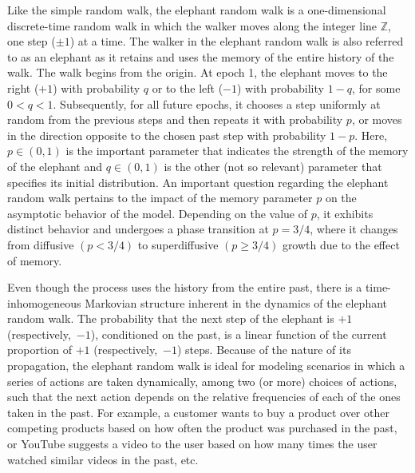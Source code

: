 \documentclass[12pt]{amsart}
\theoremstyle{plain}
\theoremstyle{remark}
\numberwithin{equation}{section}
\begin{document}
Like the simple random walk, the elephant random walk is a one-dimensional discrete-time random walk in which the walker moves along the integer line $\mathbb{Z}$, one step ($\pm 1$) at a time. The walker in the elephant random walk is also referred to as an elephant as it retains and uses the memory of the entire history of the walk. The walk begins from the origin. At epoch 1, the elephant moves to the right ($+1$) with probability $q$ or to the left ($-1$) with probability $1 - q$, for some $0 < q < 1$. Subsequently, for all future epochs, it chooses a step uniformly at random from the previous steps and then repeats it with probability $p$, or moves in the direction opposite to the chosen past step with probability $1-p$. Here, $p \in (0,1)$ is the important parameter that indicates the strength of the memory of the elephant and $q \in (0,1)$ is the other (not so relevant) parameter that specifies its initial distribution. An important question regarding the elephant random walk pertains to the impact of the memory parameter $p$ on the asymptotic behavior of the model. Depending on the value of $p$, it exhibits distinct behavior and undergoes a phase transition at $p = 3/4$, where it changes from diffusive $(p < 3/4)$ to superdiffusive $(p \geq 3/4)$ growth due to the effect of memory. 

{Even though the process uses the history from the entire past,} there is a time-inhomogeneous Markovian structure inherent in the dynamics of the elephant random walk. The probability that the next step of the elephant is $+1$ (respectively,~$-1$), conditioned on the past, is a linear function of the current proportion of $+1$ (respectively,~$-1$) steps. Because of the nature of its propagation, the elephant random walk is ideal for modeling scenarios in which a series of actions are taken dynamically, among two (or more) choices of actions, such that the next action depends on the relative frequencies of each of the ones taken in the past. For example, a customer wants to buy a product over other competing products based on how often the product was purchased in the past, or YouTube suggests a video to the user based on how many times the user watched similar videos in the past, etc. 
\end{document}

